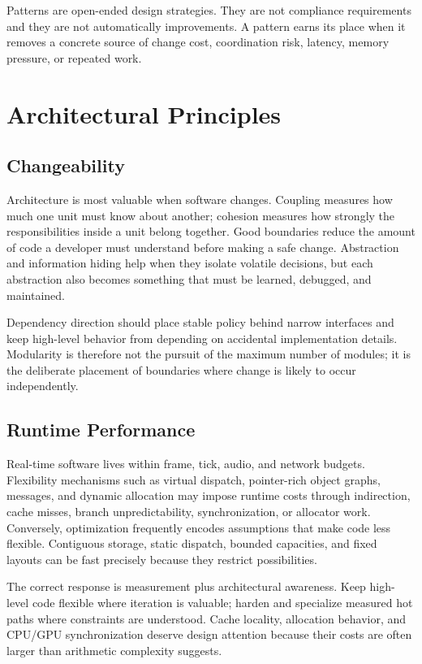 \documentclass[11pt]{article}
\begin{document}
\begin{engineeringnote}
Patterns are open-ended design strategies. They are not compliance requirements and they are not automatically improvements. A pattern earns its place when it removes a concrete source of change cost, coordination risk, latency, memory pressure, or repeated work.
\end{engineeringnote}

\section{Architectural Principles}\label{sec:principles}
\subsection{Changeability}
Architecture is most valuable when software changes. Coupling measures how much one unit must know about another; cohesion measures how strongly the responsibilities inside a unit belong together. Good boundaries reduce the amount of code a developer must understand before making a safe change. Abstraction and information hiding help when they isolate volatile decisions, but each abstraction also becomes something that must be learned, debugged, and maintained.

Dependency direction should place stable policy behind narrow interfaces and keep high-level behavior from depending on accidental implementation details. Modularity is therefore not the pursuit of the maximum number of modules; it is the deliberate placement of boundaries where change is likely to occur independently.

\subsection{Runtime Performance}
Real-time software lives within frame, tick, audio, and network budgets. Flexibility mechanisms such as virtual dispatch, pointer-rich object graphs, messages, and dynamic allocation may impose runtime costs through indirection, cache misses, branch unpredictability, synchronization, or allocator work. Conversely, optimization frequently encodes assumptions that make code less flexible. Contiguous storage, static dispatch, bounded capacities, and fixed layouts can be fast precisely because they restrict possibilities.

The correct response is measurement plus architectural awareness. Keep high-level code flexible where iteration is valuable; harden and specialize measured hot paths where constraints are understood. Cache locality, allocation behavior, and CPU/GPU synchronization deserve design attention because their costs are often larger than arithmetic complexity suggests.
\end{document}
